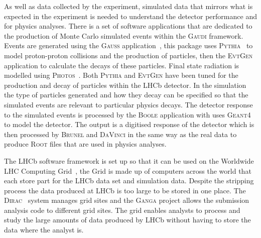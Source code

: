 As well as data collected by the experiment, simulated data that mirrors what is expected in the experiment is needed to understand the detector performance and for physics analyses. There is a set of software applications that are dedicated to the production of Monte Carlo simulated events within the \textsc{Gaudi} framework. Events are generated using the \textsc{Gauss} application~\cite{1742-6596-331-3-032047, Clemencic:2011zza}, this package uses \textsc{Pythia}~\cite{Sjostrand:2006za,Sjostrand:2007gs} to model proton-proton collisions and the production of particles, then the \textsc{Evt}\textsc{Gen}~\cite{Lange:2001uf} application to calculate the decays of these particles. Final state radiation is modelled using \textsc{Photos}~\cite{Golonka:2005pn}. Both \textsc{Pythia} and \textsc{Evt}\textsc{Gen} have been tuned for the production and decay of particles within the LHCb detector. In the simulation the type of particles generated and how they decay can be specified so that the simulated events are relevant to particular physics decays. The detector response to the simulated events is processed by the \textsc{Boole} application with uses \textsc{Geant4}~\cite{Agostinelli:2002hh,Allison:2006ve} to model the detector. The output is a digitised response of the detector which is then processed by \textsc{Brunel} and \textsc{DaVinci} in the same way as the real data to produce \textsc{Root} files that are used in physics analyses. %

The LHCb software framework is set up so that it can be used on the Worldwide LHC Computing Grid~\cite{Bird:2011zz, WWCG}, the Grid is made up of computers across the world that each store part for the LHCb data set and simulation data. Despite the stripping process the data produced at LHCb is too large to be stored in one place. The \textsc{Dirac}~\cite{Paterson:1397926} system manages grid sites and the \textsc{Ganga} project allows the submission analysis code to different grid sites. The grid enables analysts to process and study the large amounts of data produced by LHCb without having to store the data where the analyst is. 






